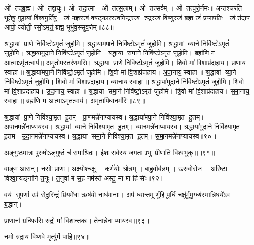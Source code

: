 ओं तद्ब्र॒ह्म। ओं तद्वा॒युः। ओं तदा॒त्मा। ओं तत्स॒त्यम्‌।
ओं तत्सर्वम्‌। ओं तत्पुरो॒र्नमः॥
अन्तश्चरति॑ भूते॒षु॒ गुहायां वि॑श्वमू॒र्तिषु। 
त्वं यज्ञस्त्वं वषट्कारस्त्वमिन्द्रस्त्व रुद्रस्त्वं विष्णुस्त्वं ब्रह्म त्वं॑ प्रजा॒पतिः।
त्वं त॑दाप॒ आपो॒ ज्योती॒ रसो॒ऽमृतं॒ ब्रह्म॒ भूर्भुव॒स्सुव॒रोम्‌॥८८॥
\anuvakamend

श्र॒द्धायां प्रा॒णे निवि॑ष्टो॒ऽमृतं॑ जुहोमि। श्र॒द्धाया॑मपा॒ने निवि॑ष्टो॒ऽमृतं॑ जुहोमि। श्र॒द्धायां व्या॒ने निवि॑ष्टो॒ऽमृतं॑ जुहोमि। श्र॒द्धाया॑मुदा॒ने निवि॑ष्टो॒ऽमृतं॑ जुहोमि। श्र॒द्धाया समा॒ने निवि॑ष्टो॒ऽमृतं॑ जुहोमि। ब्रह्म॑णि म आ॒त्माऽमृ॑त॒त्वाय॑॥ अ॒मृ॒तो॒प॒स्तर॑णमसि॥ श्र॒द्धायां प्रा॒णे निवि॑ष्टो॒ऽमृतं॑ जुहोमि। शि॒वो मा॑ वि॒शाप्र॑दाहाय। प्रा॒णाय॒ स्वाहा॥ श्र॒द्धाया॑मपा॒ने निवि॑ष्टो॒ऽमृतं॑ जुहोमि। शि॒वो मा॑ वि॒शाप्र॑दाहाय। अ॒पा॒नाय॒ स्वाहा॥ श्र॒द्धायां व्या॒ने निवि॑ष्टो॒ऽमृतं॑ जुहोमि। शि॒वो मा॑ वि॒शाप्र॑दाहाय। व्या॒नाय॒ स्वाहा॥ श्र॒द्धाया॑मुदा॒ने निवि॑ष्टो॒ऽमृतं॑ जुहोमि। शि॒वो मा॑ वि॒शाप्र॑दाहाय। उ॒दा॒नाय॒ स्वाहा॥ श्र॒द्धाया समा॒ने निवि॑ष्टो॒ऽमृतं॑ जुहोमि। शि॒वो मा॑ वि॒शाप्र॑दाहाय। स॒मा॒नाय॒ स्वाहा॥ ब्रह्म॑णि म आ॒त्माऽमृ॑त॒त्वाय॑। अ॒मृ॒ता॒पि॒धा॒नम॑सि॥८९॥
 \anuvakamend


श्र॒द्धायां प्रा॒णे निवि॑श्या॒मृत हु॒तम्। प्रा॒णमन्ने॑नाप्यायस्व। श्र॒द्धाया॑मपा॒ने निवि॑श्या॒मृत हु॒तम्। अ॒पा॒नमन्ने॑नाप्यायस्व।
श्र॒द्धायां व्या॒ने निवि॑श्या॒मृत हु॒तम्। व्या॒नमन्ने॑नाप्यायस्व। श्र॒द्धाया॑मुदा॒ने निवि॑श्या॒मृत हु॒तम। उ॒दा॒नमन्ने॑नाप्यायस्व।
श्र॒द्धाया समा॒ने निवि॑श्या॒मृत हु॒तम्। स॒मा॒नमन्ने॑नाप्या\-यस्व॥९०॥\anuvakamend

अङ्गुष्ठमात्रः पुरुषोऽङ्गुष्ठं च॑ समा॒श्रितः। ईशः सर्वस्य जगतः प्रभुः प्रीणाति॑ विश्व॒भुक्॥॥९१॥\anuvakamend

वाङ्म॑ आ॒सन्। न॒सोः प्रा॒णः। अ॒क्ष्योश्चक्षु॑। कर्ण॑योः॒ श्रोत्रम्। बा॒हु॒वोर्बलम्। ऊ॒रु॒वोरोज॑। अरि॑ष्टा॒ विश्वा॒न्यङ्गा॑नि त॒नूः। त॒नुवा॑ मे स॒ह नम॑स्ते अस्तु॒ मा मा॑ हिसीः॥९२॥
\anuvakamend

वय॑ सुप॒र्णा उप॑ सेदु॒रिन्द्रं॑ प्रि॒यमे॑धा॒ ऋष॑यो॒ नाध॑मानाः। अप॑ ध्वा॒न्तमूर्णु॒हि पू॒र्धि चक्षु॑र्मुमु॒ग्ध्य॑स्मान्नि॒धये॑ऽव ब॒द्धान्।\anuvakamend

प्राणानां ग्रन्थिरसि रुद्रो मा॑ विशा॒न्तकः। तेनान्नेनाप्या\-य॒स्व॥९३॥ \anuvakamend

नमो रुद्राय विष्णवे मृत्यु॑र्मे पा॒हि॥९४॥ \anuvakamend


